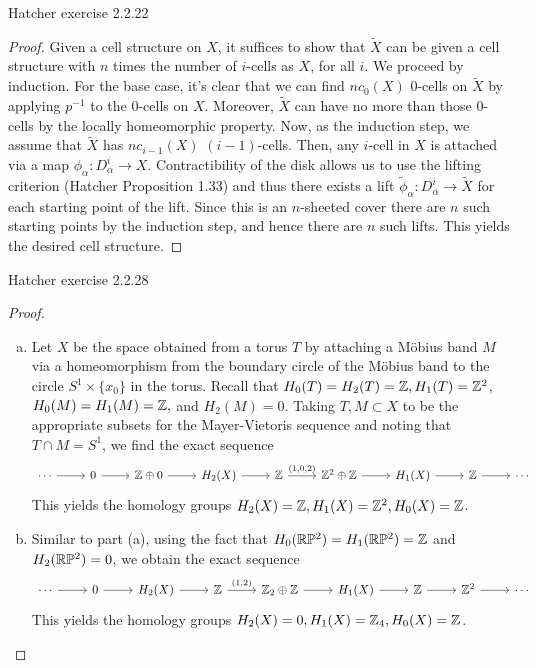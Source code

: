 \documentclass{../../mathnotes}
\begin{document}
\begin{prop}
    Hatcher exercise 2.2.22
\end{prop}
\begin{proof}
    Given a cell structure on $X$, it suffices to show that $\tilde X$ can be given a cell structure with
    $n$ times the number of $i$-cells as $X$, for all $i$. We proceed by induction. For the base case,
    it's clear that we can find $nc_0(X)$ 0-cells on $\tilde X$ by applying $p^{-1}$ to the 0-cells on $X$. Moreover,
    $\tilde X$ can have no more than those 0-cells by the locally homeomorphic property. Now, as the induction
    step, we assume that $\tilde X$ has $nc_{i-1}(X)$ $(i-1)$-cells. Then, any $i$-cell in $X$ is attached via
    a map $\phi_\alpha: D^i_\alpha\to X$. Contractibility of the disk allows us to use the lifting criterion
    (Hatcher Proposition 1.33) and thus there exists a lift $\tilde\phi_\alpha:D^i_\alpha\to \tilde X$ for each
    starting point of the lift. Since this is an $n$-sheeted cover there are $n$ such starting points by the
    induction step, and hence there are $n$ such lifts. This yields the desired cell structure. 
\end{proof}

\begin{prop}
    Hatcher exercise 2.2.28
\end{prop}
\begin{proof}\hfill
    \begin{enumerate}[(a)]
        \item Let $X$ be the space obtained from a torus $T$ by attaching a M\"obius band $M$
            via a homeomorphism from the boundary circle of the M\"obius band to the circle $S^1\times \{x_0\}$
            in the torus. Recall that $H_0(T)=H_2(T)=\mathbb{Z}, H_1(T)=\mathbb{Z}^2$, $H_0(M)=H_1(M)=\mathbb{Z},$ and $H_2(M)=0$.
            Taking $T,M\subset X$ to be the appropriate subsets for the Mayer-Vietoris sequence and noting
            that $T\cap M=S^1$, we find the exact sequence
            \begin{equation*}
                \begin{tikzcd}
                    \cdots\ar{r} & 0\ar{r} & \Z\oplus 0\ar{r} & H_2(X)\ar{r} & \Z\ar{r}{(1,0,2)} & \Z^2\oplus \Z\ar{r} & H_1(X)\ar{r} & \Z\ar{r} & \cdots
                \end{tikzcd}
            \end{equation*}
            This yields the homology groups $H_2(X)=\mathbb{Z}, H_1(X)=\mathbb{Z}^2, H_0(X)=\mathbb{Z}$.
        \item Similar to part (a), using the fact that $H_0(\mathbb{R}\mathbb{P}^2)=H_1(\mathbb{R}\mathbb{P}^2)=\mathbb{Z}$ and $H_2(\mathbb{R}\mathbb{P}^2)=0$, we obtain
            the exact sequence
            \begin{equation*}
                \begin{tikzcd}
                    \cdots\ar{r} & 0\ar{r} & H_2(X)\ar{r} & \Z\ar{r}{(1,2)} & \Z_2\oplus \Z\ar{r} & H_1(X)\ar{r} & \Z\ar{r} & \Z^2\ar{r} & \cdots
                \end{tikzcd}
            \end{equation*}
            This yields the homology groups $H_2(X)=0, H_1(X)=\mathbb{Z}_4, H_0(X)=\mathbb{Z}$.
    \end{enumerate}
\end{proof}
\end{document}
